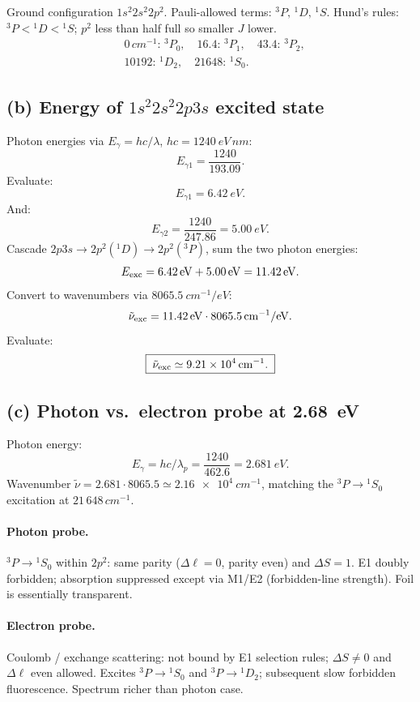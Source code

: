 \documentclass[11pt]{article}
\begin{document}
Ground configuration $1s^2 2s^2 2p^2$. Pauli-allowed terms: $^3P,\,^1D,\,^1S$. Hund's rules: $^3P<{}^1D<{}^1S$; $p^2$ less than half full so smaller $J$ lower.
\begin{equation}
\boxed{\;
\begin{aligned}
&0\,\si{cm^{-1}}:\,{}^3P_0,\quad 16.4:\,{}^3P_1,\quad 43.4:\,{}^3P_2,\\
&10192:\,{}^1D_2,\quad 21648:\,{}^1S_0.
\end{aligned}\;}
\label{eq:terms}
\end{equation}

\subsection*{(b) Energy of $1s^2 2s^2 2p3s$ excited state}

Photon energies via $E_\gamma=hc/\lambda$, $hc=\SI{1240}{eV\,nm}$:
\[
E_{\gamma 1}=\frac{1240}{193.09}.
\]
Evaluate:
\[
E_{\gamma 1}=\SI{6.42}{eV}.
\]
And:
\[
E_{\gamma 2}=\frac{1240}{247.86}=\SI{5.00}{eV}.
\]
Cascade $2p3s\to 2p^2(^1D)\to 2p^2(^3P)$, sum the two photon energies:
\[
E_{\rm exc}=\SI{6.42}{eV}+\SI{5.00}{eV}=\SI{11.42}{eV}.
\]
Convert to wavenumbers via $\SI{8065.5}{cm^{-1}/eV}$:
\[
\tilde\nu_{\rm exc}=\SI{11.42}{eV}\cdot\SI{8065.5}{cm^{-1}/eV}.
\]
Evaluate:
\begin{equation}
\boxed{\;\tilde\nu_{\rm exc}\simeq\SI{9.21e4}{cm^{-1}}.\;}
\label{eq:Eexc}
\end{equation}

\subsection*{(c) Photon vs.\ electron probe at \SI{2.68}{eV}}

Photon energy:
\[
E_\gamma=hc/\lambda_p=\frac{1240}{462.6}=\SI{2.681}{eV}.
\]
Wavenumber $\tilde\nu=2.681\cdot 8065.5\simeq\SI{2.16e4}{cm^{-1}}$, matching the $^3P\to{}^1S_0$ excitation at $21\,648\,\si{cm^{-1}}$.

\paragraph{Photon probe.} $^3P\to{}^1S_0$ within $2p^2$: same parity ($\Delta\ell=0$, parity even) and $\Delta S=1$. E1 doubly forbidden; absorption suppressed except via M1/E2 (forbidden-line strength). Foil is essentially transparent.

\paragraph{Electron probe.} Coulomb / exchange scattering: not bound by E1 selection rules; $\Delta S\neq 0$ and $\Delta\ell$ even allowed. Excites $^3P\to{}^1S_0$ and $^3P\to{}^1D_2$; subsequent slow forbidden fluorescence. Spectrum richer than photon case.
\end{document}

